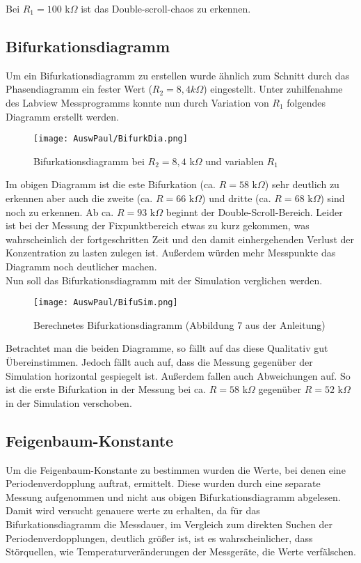 Bei $R_1 = 100$ k$\Omega$ ist das Double-scroll-chaos zu erkennen.
\newpage
\subsection{Bifurkationsdiagramm}
Um ein Bifurkationsdiagramm zu erstellen wurde ähnlich zum Schnitt durch das Phasendiagramm ein fester Wert (\(R_2=8,4k \Omega\)) eingestellt. Unter zuhilfenahme des Labview Messprogramms konnte nun durch Variation von \(R_1\) folgendes Diagramm erstellt werden.

\begin{figure}[h]
    \centering
    \texttt{[image: AuswPaul/BifurkDia.png]}
    \caption{Bifurkationsdiagramm bei $R_2 = 8,4$ k$\Omega$ und variablen $R_1$}
\end{figure}

Im obigen Diagramm ist die este Bifurkation (ca. $R = 58$ k$\Omega$) sehr deutlich zu erkennen aber auch die zweite (ca. $R = 66$ k$\Omega$) und dritte (ca. $R = 68$ k$\Omega$) sind noch zu erkennen. Ab ca. $R=93$ k$\Omega$ beginnt der Double-Scroll-Bereich. Leider ist bei der Messung der Fixpunktbereich etwas zu kurz gekommen, was wahrscheinlich der fortgeschritten Zeit und den damit einhergehenden Verlust der Konzentration zu lasten zulegen ist. Außerdem würden mehr Messpunkte das Diagramm noch deutlicher machen.\\
Nun soll das Bifurkationsdiagramm mit der Simulation verglichen werden.

\newpage
\begin{figure}[h]
    \centering
    \texttt{[image: AuswPaul/BifuSim.png]}
    \caption{Berechnetes Bifurkationsdiagramm (Abbildung 7 aus der Anleitung)}
\end{figure}

Betrachtet man die beiden Diagramme, so fällt auf das diese Qualitativ gut Übereinstimmen. Jedoch fällt auch auf, dass die Messung gegenüber der Simulation horizontal gespiegelt ist. Außerdem fallen auch Abweichungen auf. So ist die erste Bifurkation in der Messung bei ca. $R=58$ k$\Omega$ gegenüber $R=52$ k$\Omega$ in der Simulation verschoben.


\newpage
\subsection{Feigenbaum-Konstante}

Um die Feigenbaum-Konstante zu bestimmen wurden die Werte, bei denen eine Periodenverdopplung auftrat, ermittelt. 
Diese wurden durch eine separate Messung aufgenommen und nicht aus obigen Bifurkationsdiagramm abgelesen.
Damit wird versucht genauere werte zu erhalten, da für das Bifurkationsdiagramm die Messdauer, im Vergleich zum direkten Suchen der Periodenverdopplungen, deutlich größer ist, ist es wahrscheinlicher, dass Störquellen, wie Temperaturveränderungen der Messgeräte, die Werte verfälschen.\\

